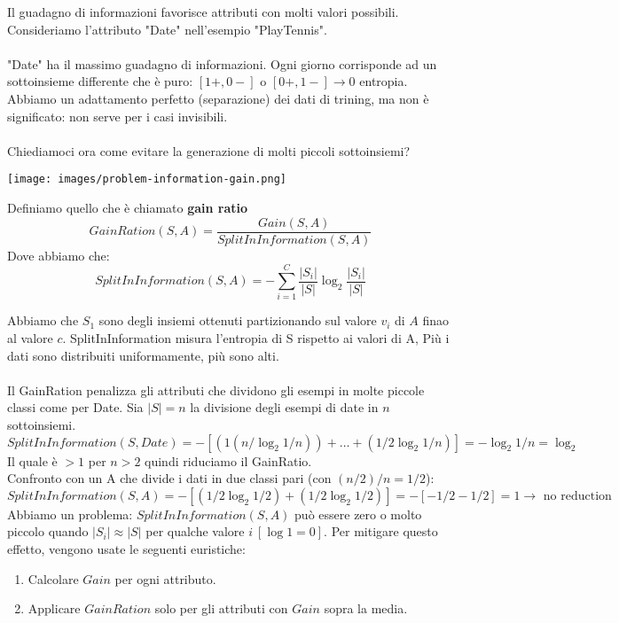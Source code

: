 \begin{minipage}{0.65\linewidth}
    Il guadagno di informazioni favorisce attributi con molti valori possibili. Consideriamo l'attributo "Date" nell'esempio "PlayTennis".\\\\
    "Date" ha il massimo guadagno di informazioni. Ogni giorno corrisponde ad un sottoinsieme differente che è puro: $[1+, 0-]$ o $[0+, 1-] \to 0$ entropia. 
    Abbiamo un adattamento perfetto (separazione) dei dati di trining, ma non è significato: non serve per i casi invisibili. \\\\
    Chiediamoci ora come evitare la generazione di molti piccoli
    sottoinsiemi?    
\end{minipage}
\hfill
\begin{minipage}{0.35\linewidth}
    \centering
    \texttt{[image: images/problem-information-gain.png]}
\end{minipage}
\begin{definition}
    Definiamo quello che è chiamato \textbf{gain ratio}
    $$GainRation(S, A) = \frac{Gain(S, A)}{SplitInInformation(S, A)}$$
    Dove abbiamo che:
    $$SplitInInformation(S, A) = -\sum_{i=1}^{C}\frac{|S_i|}{|S|} \log_2\frac{|S_i|}{|S|}$$
\end{definition}
\hspace{-15pt}Abbiamo che $S_1$ sono degli insiemi ottenuti partizionando sul valore $v_i$ di $A$ finao al valore $c$.
SplitInInformation misura l'entropia di S rispetto ai valori di A, Più i dati sono distribuiti uniformamente, più sono alti.\\\\
Il GainRation penalizza gli attributi che dividono gli esempi in molte piccole classi come per Date.
Sia $|S| = n$ la divisione degli esempi di date in $n$ sottoinsiemi.
$$SplitInInformation(S, Date) = -[(1(n/\log_2 1/n)) + \dots + (1/2 \log_2 1/n)] = -\log_2 1/n = \log_2$$
Il quale è $> 1$ per $n > 2$ quindi riduciamo il GainRatio.\\
Confronto con un A che divide i dati in due classi pari (con $(n/2)/n = 1/2$):
$$SplitInInformation(S, A) = -[(1/2 \log_2 1/2) + (1/2\log_2 1/2)] = -[-1/2 - 1/2] = 1 \to \text{ no reduction }$$
Abbiamo un problema: $SplitInInformation(S, A)$ può essere zero o molto piccolo quando $|S_i|\approx |S|$ per qualche valore $i \: [\log 1 = 0]$.
Per mitigare questo effetto, vengono usate le seguenti euristiche:
\begin{enumerate}
    \item Calcolare $Gain$ per ogni attributo.
    \item Applicare $GainRation$ solo per gli attributi con $Gain$ sopra la media.
\end{enumerate} 